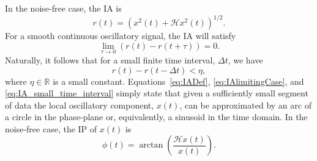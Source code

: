 \documentclass[journal,11pt,a4paper,onecolumn,draftcls]{IEEEtran}
\begin{document}
In the noise-free case, the IA is
\begin{equation}\label{eq:IADef}
    r\left( t \right) = \left( x^2(t) + \mathcal{H}x^2(t)\right)^{1/2}.
\end{equation}
For a smooth continuous oscillatory signal, the IA will satisfy
\begin{equation}\label{eq:IAlimitingCase}
\mathop {\lim }\limits_{\tau  \to 0} \left( r\left( t \right) - r\left( t + \tau \right) \right) = 0.
\end{equation}
Naturally, it follows that for a small finite time interval, $\Delta t$, we have
\begin{equation}\label{eq:IA_small_time_interval}
    r(t)-r(t-\Delta t) < \eta,
\end{equation}
where $\eta \in \mathbb{R}$ is a small constant. Equations~\ref{eq:IADef}, \ref{eq:IAlimitingCase}, and \ref{eq:IA_small_time_interval} simply state that given a sufficiently small segment of data the local oscillatory component, $x(t)$, can be approximated by an arc of a circle in the phase-plane or, equivalently, a sinusoid in the time domain. In the noise-free case, the IP of $x(t)$ is
\begin{equation}\label{IPdef}
    \phi \left( t \right) = \arctan \left( \frac{\mathcal{H}x\left( t \right)}
    {x\left( t \right)} \right).
\end{equation}
\end{document}
